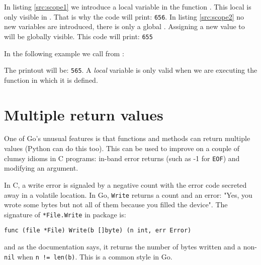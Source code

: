 In listing \ref{src:scope1} we introduce a local variable 
in the function .
This local  is only visible in . That is
why the code will print: \texttt{656}.
In listing \ref{src:scope2} no new variables are introduced, there
is only a global .
Assigning a new value to will be globally visible. This code will
print: \texttt{655}

In the following example we call  from :



The printout will be: \texttt{565}. A \emph{local} variable is only
valid when we are executing the function in which it is defined. 

\section{Multiple return values}
\label{sec:multiple return}
One of Go's unusual features is that functions and methods can return multiple
values (Python can do this too). This can be used to improve on a couple of 
clumsy idioms in C programs:
in-band error returns (such as -1 for \texttt{EOF}) and modifying an argument.

In C, a write error is signaled by a negative count with the error code
secreted away in a volatile location. In Go, \lstinline{Write} returns a count and an
error: "Yes, you wrote some bytes but not all of them because you filled the
device". The signature of \lstinline{*File.Write} in package
 is:
\begin{lstlisting}
func (file *File) Write(b []byte) (n int, err Error)
\end{lstlisting}
and as the documentation says, it returns the number of bytes written and a
non-\lstinline{nil}  when \lstinline{n != len(b)}. This is a common
style in Go.

